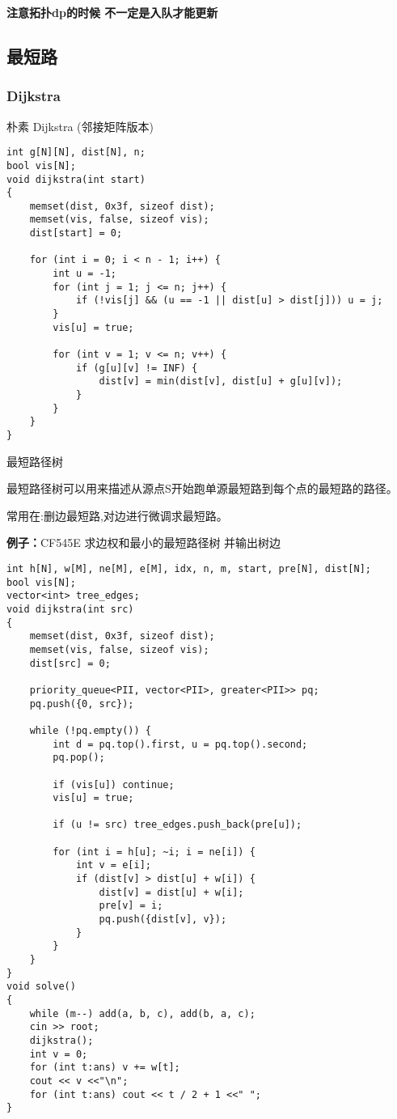 \documentclass[a4paper, fontset=none]{ctexart}
\begin{document}
\textbf{注意拓扑dp的时候 不一定是入队才能更新}
\subsection{最短路}
\subsubsection{Dijkstra}
朴素 Dijkstra (邻接矩阵版本)
\begin{verbatim}
int g[N][N], dist[N], n;
bool vis[N];
void dijkstra(int start)
{
    memset(dist, 0x3f, sizeof dist);
    memset(vis, false, sizeof vis);
    dist[start] = 0;

    for (int i = 0; i < n - 1; i++) {
        int u = -1;
        for (int j = 1; j <= n; j++) {
            if (!vis[j] && (u == -1 || dist[u] > dist[j])) u = j;
        }
        vis[u] = true;

        for (int v = 1; v <= n; v++) {
            if (g[u][v] != INF) {
                dist[v] = min(dist[v], dist[u] + g[u][v]);
            }
        }
    }
}
\end{verbatim}

最短路径树

最短路径树可以用来描述从源点S开始跑单源最短路到每个点的最短路的路径。

常用在:删边最短路,对边进行微调求最短路。

\textbf{例子：}CF545E   求边权和最小的最短路径树 并输出树边

\begin{verbatim}
int h[N], w[M], ne[M], e[M], idx, n, m, start, pre[N], dist[N];
bool vis[N];
vector<int> tree_edges;
void dijkstra(int src)
{
    memset(dist, 0x3f, sizeof dist);
    memset(vis, false, sizeof vis);
    dist[src] = 0;

    priority_queue<PII, vector<PII>, greater<PII>> pq;
    pq.push({0, src});

    while (!pq.empty()) {
        int d = pq.top().first, u = pq.top().second;
        pq.pop();

        if (vis[u]) continue;
        vis[u] = true;

        if (u != src) tree_edges.push_back(pre[u]);

        for (int i = h[u]; ~i; i = ne[i]) {
            int v = e[i];
            if (dist[v] > dist[u] + w[i]) {
                dist[v] = dist[u] + w[i];
                pre[v] = i;
                pq.push({dist[v], v});
            }
        }
    }
}
void solve()
{
    while (m--) add(a, b, c), add(b, a, c);
    cin >> root;
    dijkstra();
    int v = 0;
    for (int t:ans) v += w[t];
    cout << v <<"\n";
    for (int t:ans) cout << t / 2 + 1 <<" ";
}
\end{verbatim}
\end{document}
